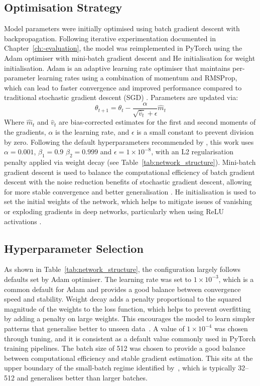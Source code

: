 \subsection{Optimisation Strategy}
\label{subsec:optimisation_strategy}
Model parameters were initially optimised using batch gradient descent with backpropagation.
Following iterative experimentation documented in Chapter~\ref{ch:-evaluation}, the model was reimplemented in PyTorch using the Adam optimiser with mini-batch gradient descent and He initialisation for weight initialisation.
Adam is an adaptive learning rate optimiser that maintains per-parameter learning rates using a combination of momentum and RMSProp, which can lead to faster convergence and improved performance compared to traditional stochastic gradient descent (SGD) \citep{kingma2015adam}.
Parameters are updated via:
\begin{equation}
    \theta_{t+1} = \theta_t - \frac{\alpha}{\sqrt{\hat{v}_t} + \epsilon} \hat{m}_t
\end{equation}
Where $\hat{m}_t$ and $\hat{v}_t$ are bias-corrected estimates for the first and second moments of the gradients, $\alpha$ is the learning rate, and $\epsilon$ is a small constant to prevent division by zero.
Following the default hyperparameters recommended by \citep{kingma2015adam}, this work uses $\alpha = 0.001$, $\beta_1 = 0.9$ $\beta_2 = 0.999$ and $\epsilon = 1 \times 10^{-8}$, with an L2 regularisation penalty applied via weight decay (see Table~\ref{tab:network_structure}).
Mini-batch gradient descent is used to balance the computational efficiency of batch gradient descent with the noise reduction benefits of stochastic gradient descent, allowing for more stable convergence and better generalisation \citep{masters2018revisiting}.
He initialisation is used to set the initial weights of the network, which helps to mitigate issues of vanishing or exploding gradients in deep networks, particularly when using ReLU activations \citep{he2015delving}.

\subsection{Hyperparameter Selection}
As shown in Table~\ref{tab:network_structure}, the configuration largely follows defaults set by Adam optimiser.
The learning rate was set to $1\times10^{-3}$, which is a common default for Adam and provides a good balance between convergence speed and stability.
Weight decay adds a penalty proportional to the squared magnitude of the weights to the loss function, which helps to prevent overfitting by adding a penalty on large weights.
This encourages the model to learn simpler patterns that generalise better to unseen data~\citep{Krogh1992}.
A value of $1\times10^{-4}$ was chosen through tuning, and it is consistent as a default value commonly used in PyTorch training pipelines.
The batch size of 512 was chosen to provide a good balance between computational efficiency and stable gradient estimation.
This sits at the upper boundary of the small-batch regime identified by~\citet{Keskar2017}, which is typically 32--512 and generalises better than larger batches.


